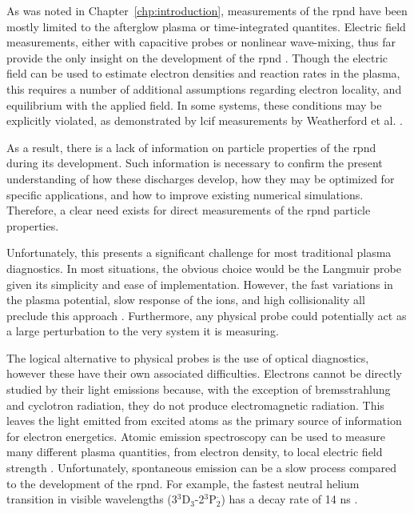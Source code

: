 As was noted in Chapter~\ref{chp:introduction}, measurements of the \acs{rpnd}
have been mostly limited to the afterglow plasma or time-integrated quantites.
Electric field measurements, either with capacitive probes or nonlinear
wave-mixing, thus far provide the only insight on the development of the
\acs{rpnd} \cite{Ito2010, Muller2011a, Takashima2011}. Though the electric field
can be used to estimate electron densities and reaction rates in the plasma,
this requires a number of additional assumptions regarding electron locality,
and equilibrium with the applied field. In some systems, these conditions may be
explicitly violated, as demonstrated by \acs{lcif} measurements by Weatherford
et al. \cite{Weatherford2012}.

As a result, there is a lack of information on particle properties of the
\acs{rpnd} during its development. Such information is necessary to confirm the
present understanding of how these discharges develop, how they may be optimized
for specific applications, and how to improve existing numerical simulations.
Therefore, a clear need exists for direct measurements of the \acs{rpnd}
particle properties.

Unfortunately, this presents a significant challenge for most traditional plasma
diagnostics. In most situations, the obvious choice would be the Langmuir probe
given its simplicity and ease of implementation. However, the fast variations in
the plasma potential, slow response of the ions, and high collisionality all
preclude this approach \cite{Lieberman2005}. Furthermore, any physical probe
could potentially act as a large perturbation to the very system it is
measuring.

The logical alternative to physical probes is the use of optical diagnostics,
however these have their own associated difficulties. Electrons cannot be
directly studied by their light emissions because, with the exception of
bremsstrahlung and cyclotron radiation, they do not produce electromagnetic
radiation. This leaves the light emitted from excited atoms as the primary
source of information for electron energetics. Atomic emission spectroscopy can
be used to measure many different plasma quantities, from electron density, to
local electric field strength \cite{Griem2005}. Unfortunately, spontaneous
emission can be a slow process compared to the development of the \acs{rpnd}.
For example, the fastest neutral helium transition in visible wavelengths
(3$^3$D$_3$-2$^3$P$_2^\cdot$) has a decay rate of 14 ns \cite{Kramida2012}.

